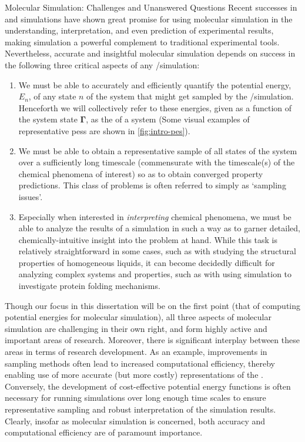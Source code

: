 \begin{section}{Molecular Simulation: Challenges and Unanswered Questions}
Recent successes in \md and \mc simulations
have shown great promise for using molecular simulation in the understanding,
interpretation, and even prediction of experimental
results,\cite{VanGunsteren1990}
making simulation a powerful complement to traditional experimental tools.
\cite{Hospital2015,Karplus2002,Bereau2016,Chen2015,Maurin2016,Jiang2011,Schneider2005,Jorgensen2004}
Nevertheless, accurate and insightful molecular simulation
depends on success in the following three critical aspects of any \md/\mc simulation:
\cite{Lane2013}
%
\begin{enumerate}
\item We must be able to accurately and efficiently quantify the potential
energy, $E_n$, of any state $n$ of the system that might get sampled by the
\md/\mc simulation. 
\cite{Ballone2014,Lopes2015,Saunders2013,DeCarvalho2014}
Henceforth we will collectively refer to these energies, given as a function
of the system state $\bm \Gamma$, as the \pes of a system (Some visual
examples of representative \glspl{pes} are shown in \cref{fig:intro-pes}).
\item We must be able to obtain a representative sample of all states of the system over a sufficiently long timescale
(commensurate with the timescale(s) of the chemical phenomena of interest) so as
to obtain converged property predictions.
\cite{Lei2007,Grossfield2010,Theodorou2010}
This class of problems is often referred to simply as `sampling issues'.
\item Especially when interested in \emph{interpreting} chemical phenomena, we must be
able to analyze the results of a simulation in such a way as to garner
detailed, chemically-intuitive insight into the problem at hand.
\cite{E2010,Pande2010,Rohrdanz2013}
While this task is relatively straightforward in some cases, such as with
studying the structural properties of homogeneous liquids,
it can become decidedly
difficult for analyzing complex systems and properties, such as with using
simulation to investigate protein folding mechanisms.
\end{enumerate}
Though our focus in this dissertation will be on the first point (that of
computing potential energies for molecular simulation), all three 
aspects of molecular simulation are challenging in their own right, and form
highly active and important areas of research. 
\cite{Ciccotti2014} 
Moreover, there is significant interplay between these areas in terms of
research development.
As an example, improvements in sampling methods often lead to increased computational
efficiency, thereby enabling use of more accurate (but more costly)
representations of the \pes. Conversely, the development of
cost-effective potential energy functions is often necessary for
running simulations over long enough time scales to ensure representative
sampling and robust interpretation of the simulation results. Clearly, insofar
as molecular simulation is concerned, both
accuracy and computational efficiency are of paramount importance. 


\end{section}

